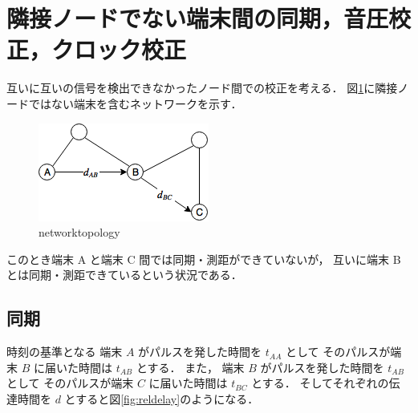 \section{隣接ノードでない端末間の同期，音圧校正，クロック校正}


互いに互いの信号を検出できなかったノード間での校正を考える．
図\ref{fig:networktopology}に隣接ノードではない端末を含むネットワークを示す．

\begin{figure}[p]\centering
  \hspace{-2mm}\includegraphics[clip,width=1.1\hsize]{img/network_topology.png}
  \caption{networktopology}\label{fig:networktopology}
\end{figure}

このとき端末 A と端末 C 間では同期・測距ができていないが，
互いに端末 B とは同期・測距できているという状況である．

\subsection{同期}

時刻の基準となる
端末 $A$ がパルスを発した時間を $t_{AA}$ として
そのパルスが端末 $B$ に届いた時間は $t_{AB}$ とする．
また，
端末 $B$ がパルスを発した時間を $t_{AB}$ として
そのパルスが端末 $C$ に届いた時間は $t_{BC}$ とする．
そしてそれぞれの伝達時間を $d$ とすると図\ref{fig:reldelay}のようになる．

